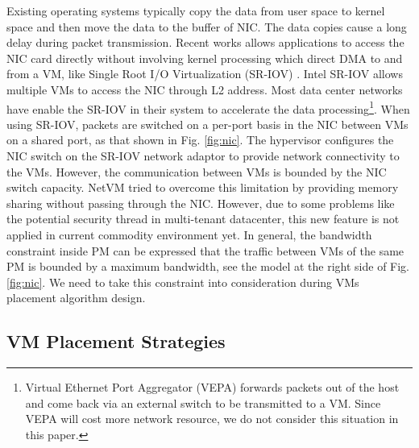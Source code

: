 \documentclass[10pt, conference, letterpaper]{IEEEtran}
\begin{document}
Existing operating systems typically copy the data from user space to kernel space and then move the data to the buffer of NIC. The data copies cause a long delay during packet transmission. Recent works allows applications to access the NIC card directly without involving kernel processing which direct DMA to and from a VM, like Single Root I/O Virtualization (SR-IOV) \cite{sriov}. Intel SR-IOV allows multiple VMs to access the NIC through L2 address. Most data center networks have enable the SR-IOV in their system to accelerate the data processing\footnote{Virtual Ethernet Port Aggregator (VEPA) forwards packets out of the host and come back via an external switch to be transmitted to a VM. Since VEPA will cost more network resource, we do not consider this situation in this paper.}. When using SR-IOV, packets are switched on a per-port basis in the NIC between VMs on a shared port, as that shown in Fig. \ref{fig:nic}. The hypervisor configures the NIC switch on the SR-IOV network adaptor to provide network connectivity to the VMs. However, the communication between VMs is bounded by the NIC switch capacity. NetVM \cite{netvm} tried to overcome this limitation by providing  memory sharing without passing through the NIC. However, due to some problems like the potential security thread in multi-tenant datacenter, this new feature is not applied in current commodity environment yet. In general, the bandwidth constraint inside PM can be expressed that the traffic between VMs of the same PM is bounded by a maximum bandwidth, see the model at the right side of Fig. \ref{fig:nic}. We need to take this constraint into consideration during VMs placement algorithm design.


\subsection{VM Placement Strategies}\label{sec:placement}

\end{document}
